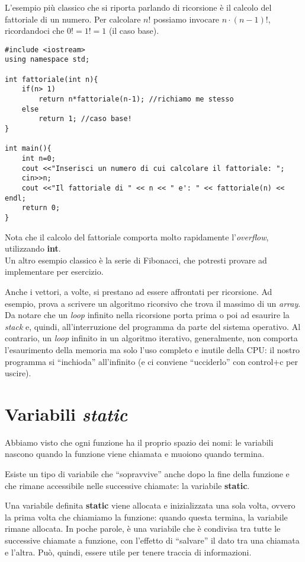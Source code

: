 \begin{subappendices}
L'esempio più classico che si riporta parlando di ricorsione è il calcolo del fattoriale di un numero. Per calcolare $n!$ possiamo invocare $n\cdot(n-1)!$, ricordandoci che $0!=1!=1$ (il caso base). 

\begin{lstlisting}
#include <iostream>
using namespace std;

int fattoriale(int n){
	if(n> 1)
		return n*fattoriale(n-1); //richiamo me stesso
	else
		return 1; //caso base!
}

int main(){
	int n=0;
	cout <<"Inserisci un numero di cui calcolare il fattoriale: "; 
	cin>>n;
	cout <<"Il fattoriale di " << n << " e': " << fattoriale(n) << endl;
	return 0;
}
\end{lstlisting}
Nota che il calcolo del fattoriale comporta molto rapidamente l'\emph{overflow},  utilizzando  \textbf{int}.\\

Un altro esempio classico è la serie di Fibonacci, che potresti provare ad implementare per esercizio.

Anche i vettori, a volte, si prestano ad essere affrontati per ricorsione. Ad esempio, prova a scrivere un algoritmo ricorsivo che trova il massimo di un \emph{array}.\\

Da notare che un \emph{loop} infinito nella ricorsione porta prima o poi ad esaurire la \emph{stack} e, quindi, all'interruzione del programma da parte del sistema operativo. Al contrario, un \emph{loop} infinito in un algoritmo iterativo, generalmente, non comporta l'esaurimento della memoria ma solo l'uso completo e inutile della CPU: il nostro programma si ``inchioda'' all'infinito (e ci conviene ``ucciderlo'' con  control+c per uscire). 

\section{Variabili \emph{static}}
Abbiamo visto che ogni funzione ha il proprio spazio dei nomi: le variabili nascono quando la funzione viene chiamata e muoiono quando termina.

Esiste un tipo di variabile che ``sopravvive'' anche dopo la fine della funzione e che rimane accessibile nelle successive chiamate: la variabile \textbf{static}. 

Una variabile definita \textbf{static} viene allocata e inizializzata una sola volta, ovvero la prima volta che chiamiamo la funzione: quando questa termina, la variabile rimane allocata. In poche parole, è una variabile che è condivisa tra tutte le successive chiamate a funzione, con l'effetto di ``salvare'' il dato tra una chiamata e l'altra.
Può, quindi, essere utile per tenere traccia di informazioni.


\end{subappendices}
